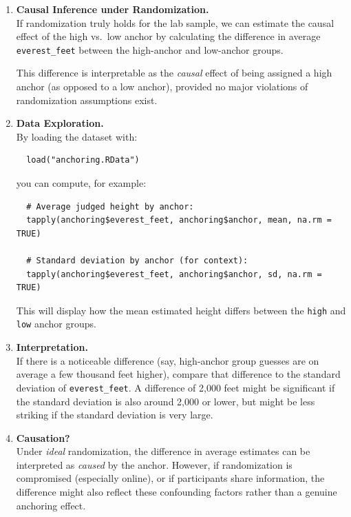 \documentclass[12pt]{article}
\begin{document}
\begin{enumerate}
  \item \textbf{Causal Inference under Randomization.}\\
  If randomization truly holds for the lab sample, we can estimate the causal effect of the high vs.\ low anchor by calculating the difference in average \texttt{everest\_feet} between the high-anchor and low-anchor groups.
  
  This difference is interpretable as the \emph{causal} effect of being assigned a high anchor (as opposed to a low anchor), provided no major violations of randomization assumptions exist.

  \item \textbf{Data Exploration.}\\
  By loading the dataset with:
  \begin{verbatim}
  load("anchoring.RData")
  \end{verbatim}
  you can compute, for example:
  \begin{verbatim}
  # Average judged height by anchor:
  tapply(anchoring$everest_feet, anchoring$anchor, mean, na.rm = TRUE)
  
  # Standard deviation by anchor (for context):
  tapply(anchoring$everest_feet, anchoring$anchor, sd, na.rm = TRUE)
  \end{verbatim}
  This will display how the mean estimated height differs between the \texttt{high} and \texttt{low} anchor groups.

  \item \textbf{Interpretation.}\\
  If there is a noticeable difference (say, high-anchor group guesses are on average a few thousand feet higher), compare that difference to the standard deviation of \texttt{everest\_feet}. A difference of 2,000 feet might be significant if the standard deviation is also around 2,000 or lower, but might be less striking if the standard deviation is very large.

  \item \textbf{Causation?}\\
  Under \emph{ideal} randomization, the difference in average estimates can be interpreted as \emph{caused} by the anchor. However, if randomization is compromised (especially online), or if participants share information, the difference might also reflect these confounding factors rather than a genuine anchoring effect.


\end{enumerate}
\end{document}
